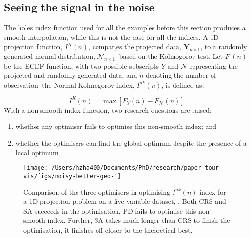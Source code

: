 \hypertarget{seeing-the-signal-in-the-noise}{%
\subsection{Seeing the signal in the
noise}\label{seeing-the-signal-in-the-noise}}

The holes index function used for all the examples before this section
produces a smooth interpolation, while this is not the case for all the
indices. A 1D projection function, \(I^{K}(n)\), compar‚es the projected
data, \(\mathbf{Y}_{n \times 1}\), to a randomly generated normal
distribution, \(\mathcal{N}_{n \times 1}\), based on the Kolmogorov
test. Let \(F_{.}(n)\) be the ECDF function, with two possible
subscripts \(Y\) and \(\mathcal{N}\) representing the projected and
randomly generated data, and \(n\) denoting the number of observation,
the Normal Kolmogorov index, \(I^{nk}(n)\), is defined as:

\[I^{K}(n) = \max \left[F_{Y}(n) - F_{\mathcal{N}}(n)\right]\] With a
non-smooth index function, two research questions are raised:

\begin{enumerate}
\def\labelenumi{\arabic{enumi})}
\tightlist
\item
  whether any optimiser fails to optimise this non-smooth index; and
\item
  whether the optimisers can find the global optimum despite the
  presence of a local optimum
\end{enumerate}

\begin{Schunk}
\begin{figure}

{\centering \texttt{[image: /Users/hzha400/Documents/PhD/research/paper-tour-vis/figs/noisy-better-geo-1]} 

}

\caption[Comparison of the three optimisers in optimising $I^{nk}(n)$ index for a 1D projection problem on a five-variable dataset, ]{Comparison of the three optimisers in optimising $I^{nk}(n)$ index for a 1D projection problem on a five-variable dataset, . Both CRS and SA succeeds in the optimisation, PD fails to optimise this non-smooth index. Further, SA takes  much longer than CRS to finish the optimisation, it finishes off closer to the theoretical best.}\label{fig:noisy-better-geo}
\end{figure}
\end{Schunk}

